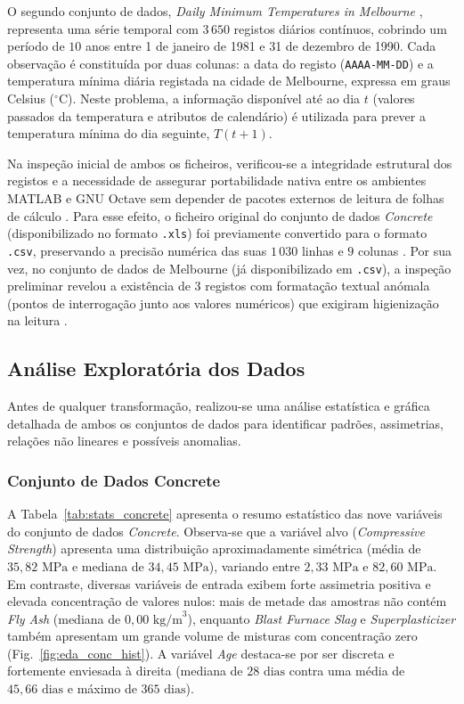 \documentclass[conference]{IEEEtran}
\begin{document}
O segundo conjunto de dados, \textit{Daily Minimum Temperatures in Melbourne} \cite{b4}, representa uma série temporal com $3\,650$ registos diários contínuos, cobrindo um período de $10$ anos entre 1 de janeiro de 1981 e 31 de dezembro de 1990. Cada observação é constituída por duas colunas: a data do registo (\texttt{AAAA-MM-DD}) e a temperatura mínima diária registada na cidade de Melbourne, expressa em graus Celsius ($^{\circ}\text{C}$). Neste problema, a informação disponível até ao dia $t$ (valores passados da temperatura e atributos de calendário) é utilizada para prever a temperatura mínima do dia seguinte, $T(t+1)$.

Na inspeção inicial de ambos os ficheiros, verificou-se a integridade estrutural dos registos e a necessidade de assegurar portabilidade nativa entre os ambientes MATLAB e GNU Octave sem depender de pacotes externos de leitura de folhas de cálculo \cite{b1}. Para esse efeito, o ficheiro original do conjunto de dados \textit{Concrete} (disponibilizado no formato \texttt{.xls}) foi previamente convertido para o formato \texttt{.csv}, preservando a precisão numérica das suas $1\,030$ linhas e $9$ colunas \cite{b1, b2}. Por sua vez, no conjunto de dados de Melbourne (já disponibilizado em \texttt{.csv}), a inspeção preliminar revelou a existência de $3$ registos com formatação textual anómala (pontos de interrogação junto aos valores numéricos) que exigiram higienização na leitura \cite{b1, b4}.

\subsection{Análise Exploratória dos Dados}
Antes de qualquer transformação, realizou-se uma análise estatística e gráfica detalhada de ambos os conjuntos de dados para identificar padrões, assimetrias, relações não lineares e possíveis anomalias.

\subsubsection{Conjunto de Dados Concrete}
A Tabela~\ref{tab:stats_concrete} apresenta o resumo estatístico das nove variáveis do conjunto de dados \textit{Concrete}. Observa-se que a variável alvo (\textit{Compressive Strength}) apresenta uma distribuição aproximadamente simétrica (média de $35{,}82\text{ MPa}$ e mediana de $34{,}45\text{ MPa}$), variando entre $2{,}33\text{ MPa}$ e $82{,}60\text{ MPa}$. Em contraste, diversas variáveis de entrada exibem forte assimetria positiva e elevada concentração de valores nulos: mais de metade das amostras não contém \textit{Fly Ash} (mediana de $0{,}00\text{ kg/m}^3$), enquanto \textit{Blast Furnace Slag} e \textit{Superplasticizer} também apresentam um grande volume de misturas com concentração zero (Fig.~\ref{fig:eda_conc_hist}). A variável \textit{Age} destaca-se por ser discreta e fortemente enviesada à direita (mediana de $28\text{ dias}$ contra uma média de $45{,}66\text{ dias}$ e máximo de $365\text{ dias}$).
\end{document}
